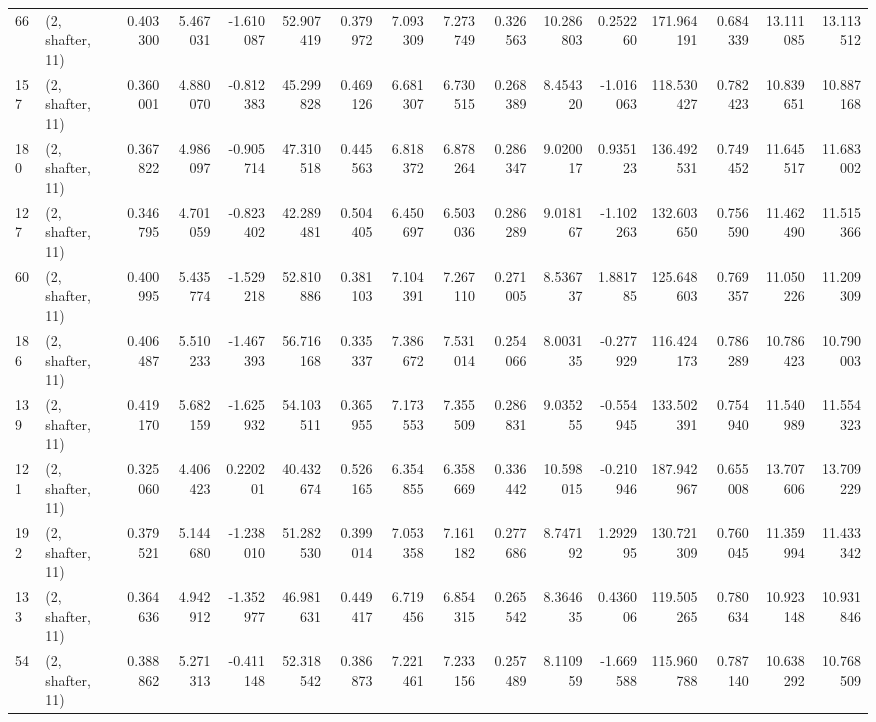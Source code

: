 \begin{tabular}{llrrrrrrrrrrrrrr}
66  &  (2, shafter, 11) &   0.403300 &   5.467031 &  -1.610087 &    52.907419 &   0.379972 &   7.093309 &   7.273749 &  0.326563 &  10.286803 &   0.252260 &   171.964191 &   0.684339 &  13.111085 &  13.113512 \\
157 &  (2, shafter, 11) &   0.360001 &   4.880070 &  -0.812383 &    45.299828 &   0.469126 &   6.681307 &   6.730515 &  0.268389 &   8.454320 &  -1.016063 &   118.530427 &   0.782423 &  10.839651 &  10.887168 \\
180 &  (2, shafter, 11) &   0.367822 &   4.986097 &  -0.905714 &    47.310518 &   0.445563 &   6.818372 &   6.878264 &  0.286347 &   9.020017 &   0.935123 &   136.492531 &   0.749452 &  11.645517 &  11.683002 \\
127 &  (2, shafter, 11) &   0.346795 &   4.701059 &  -0.823402 &    42.289481 &   0.504405 &   6.450697 &   6.503036 &  0.286289 &   9.018167 &  -1.102263 &   132.603650 &   0.756590 &  11.462490 &  11.515366 \\
60  &  (2, shafter, 11) &   0.400995 &   5.435774 &  -1.529218 &    52.810886 &   0.381103 &   7.104391 &   7.267110 &  0.271005 &   8.536737 &   1.881785 &   125.648603 &   0.769357 &  11.050226 &  11.209309 \\
186 &  (2, shafter, 11) &   0.406487 &   5.510233 &  -1.467393 &    56.716168 &   0.335337 &   7.386672 &   7.531014 &  0.254066 &   8.003135 &  -0.277929 &   116.424173 &   0.786289 &  10.786423 &  10.790003 \\
139 &  (2, shafter, 11) &   0.419170 &   5.682159 &  -1.625932 &    54.103511 &   0.365955 &   7.173553 &   7.355509 &  0.286831 &   9.035255 &  -0.554945 &   133.502391 &   0.754940 &  11.540989 &  11.554323 \\
121 &  (2, shafter, 11) &   0.325060 &   4.406423 &   0.220201 &    40.432674 &   0.526165 &   6.354855 &   6.358669 &  0.336442 &  10.598015 &  -0.210946 &   187.942967 &   0.655008 &  13.707606 &  13.709229 \\
192 &  (2, shafter, 11) &   0.379521 &   5.144680 &  -1.238010 &    51.282530 &   0.399014 &   7.053358 &   7.161182 &  0.277686 &   8.747192 &   1.292995 &   130.721309 &   0.760045 &  11.359994 &  11.433342 \\
133 &  (2, shafter, 11) &   0.364636 &   4.942912 &  -1.352977 &    46.981631 &   0.449417 &   6.719456 &   6.854315 &  0.265542 &   8.364635 &   0.436006 &   119.505265 &   0.780634 &  10.923148 &  10.931846 \\
54  &  (2, shafter, 11) &   0.388862 &   5.271313 &  -0.411148 &    52.318542 &   0.386873 &   7.221461 &   7.233156 &  0.257489 &   8.110959 &  -1.669588 &   115.960788 &   0.787140 &  10.638292 &  10.768509 \\

\end{tabular}
